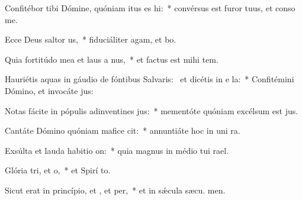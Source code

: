 \item Confitébor tibi Dómine, quóniam itus es hi:~* convérsus est furor tuus, et conso  me.
\item Ecce Deus saltor us,~* fiduciáliter agam, et  bo.
\item Quia fortitúdo mea et laus a nus,~* et factus est mihi  tem.
\item Hauriétis aquas in gáudio de fóntibus Salvaris:~\pscross{} et dicétis in e la:~* Confitémini Dómino, et invocáte  jus:
\item Notas fácite in pópulis adinventines jus:~* mementóte quóniam excélsum est  jus.
\item Cantáte Dómino quóniam mafice cit:~* annuntiáte hoc in uni ra.
\item Exsúlta et lauda habitio on:~* quia magnus in médio tui  rael.
\item Glória tri, et o,~* et Spirí to.
\item Sicut erat in princípio, et , et per,~* et in sǽcula sæcu. men.
